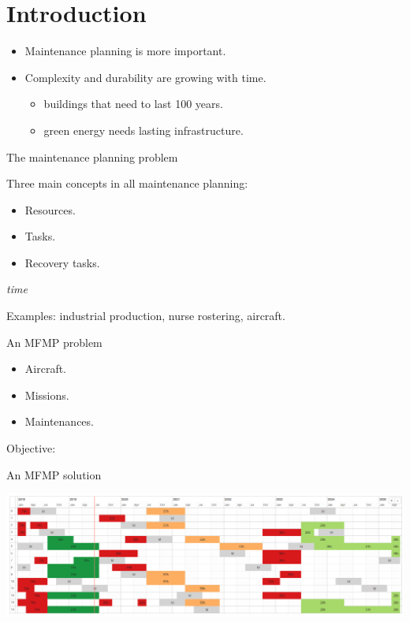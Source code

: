 \section{Introduction}

\begin{itemize}[<+->]
\item
  Maintenance planning is more important.
\item
  Complexity and durability are growing with time.

  \begin{itemize}[<+->]
  
  \item
    buildings that need to last 100 years.
  \item
    green energy needs lasting infrastructure.
  \end{itemize}
\end{itemize}

\begin{frame}{The maintenance planning problem}
\protect\hypertarget{the-maintenance-planning-problem}{}

Three main concepts in all maintenance planning:

\begin{itemize}[<+->]

\item
  Resources.
\item
  Tasks.
\item
  Recovery tasks.
\end{itemize}

\emph{time}

Examples: industrial production, nurse rostering, aircraft.

\end{frame}

\begin{frame}{An MFMP problem}
\protect\hypertarget{an-mfmp-problem}{}

\begin{itemize}[<+->]

\item
  Aircraft.
\item
  Missions.
\item
  Maintenances.
\end{itemize}

Objective:

\end{frame}

\begin{frame}

\begin{block}{An MFMP solution}

\includegraphics[width=0.7\linewidth]{calendar3}

\end{block}

\end{frame}

